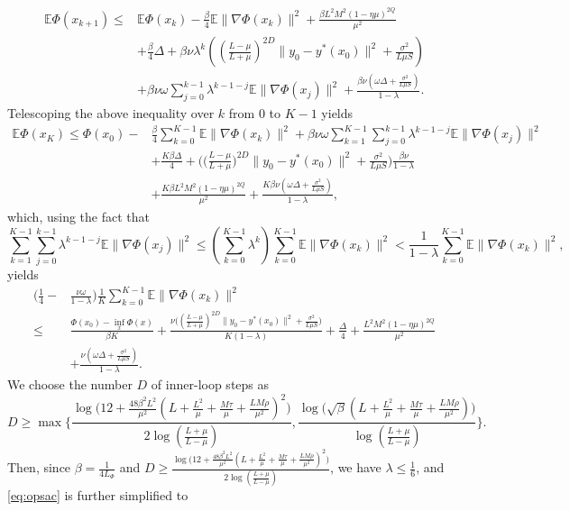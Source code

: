 \documentclass{osudissert96}
\begin{document}
\begin{align}
\mathbb{E}\Phi(x_{k+1})\leq& \mathbb{E}\Phi(x_k) -\frac{\beta}{4} \mathbb{E}\|\nabla\Phi(x_k)\|^2 +\frac{\beta L^2M^2(1-\eta \mu)^{2Q}}{\mu^2} 
\nonumber
\\&+\frac{\beta}{4} \Delta + \beta\nu\lambda^{k} \left( \left(\frac{L-\mu}{L+\mu}\right)^{2D}\|y_0-y^*(x_0)\|^2 + \frac{\sigma^2}{L\mu S}\right) \nonumber
\\&+ \beta\nu\omega\sum_{j=0}^{k-1}\lambda^{k-1-j} \mathbb{E}\|\nabla \Phi(x_j)\|^2 + \frac{\beta\nu(\omega\Delta +\frac{\sigma^2}{L\mu S})}{1-\lambda}.\nonumber
\end{align}
Telescoping the above inequality over $k$ from $0$ to $K-1$ yields
\begin{align*}
\mathbb{E}\Phi(x_{K}) \leq \Phi(x_0) - &\frac{\beta}{4} \sum_{k=0}^{K-1}\mathbb{E}\|\nabla\Phi(x_k)\|^2 + \beta\nu\omega\sum_{k=1}^{K-1}\sum_{j=0}^{k-1}\lambda^{k-1-j} \mathbb{E}\|\nabla \Phi(x_j)\|^2 \nonumber
\\&+\frac{K\beta\Delta}{4} + \Big(\Big(\frac{L-\mu}{L+\mu}\Big)^{2D}\|y_0-y^*(x_0)\|^2 + \frac{\sigma^2}{L\mu S}\Big)\frac{\beta\nu}{1-\lambda} \nonumber
\\&+ \frac{K\beta L^2M^2(1-\eta \mu)^{2Q}}{\mu^2}  + \frac{K\beta\nu(\omega\Delta +\frac{\sigma^2}{L\mu S})}{1-\lambda},
\end{align*}
which, using the fact that {\small$$\sum_{k=1}^{K-1}\sum_{j=0}^{k-1}\lambda^{k-1-j} \mathbb{E}\|\nabla \Phi(x_j)\|^2\leq \left(\sum_{k=0}^{K-1}\lambda^k\right)\sum_{k=0}^{{K-1}}\mathbb{E}\|\nabla\Phi(x_k)\|^2<\frac{1}{1-\lambda}\sum_{k=0}^{{K-1}}\mathbb{E}\|\nabla\Phi(x_k)\|^2,$$} \hspace{-0.15cm}yields
\begin{align}\label{eq:opsac}
 \Big(\frac{1}{4} -&\frac{\nu\omega}{1-\lambda}\Big) \frac{1}{K}\sum_{k=0}^{K-1}\mathbb{E}\|\nabla\Phi(x_k)\|^2 \nonumber
 \\\leq &\frac{\Phi(x_0)-\inf_x\Phi(x)}{\beta K}+\frac{\nu\big((\frac{L-\mu}{L+\mu})^{2D}\|y_0-y^*(x_0)\|^2 + \frac{\sigma^2}{L\mu S}\big)}{K(1-\lambda)}+\frac{\Delta}{4} +  \frac{ L^2M^2(1-\eta \mu)^{2Q}}{\mu^2}  \nonumber
 \\&+ \frac{\nu(\omega\Delta +\frac{\sigma^2}{L\mu S})}{1-\lambda}.
\end{align}
We choose the number $D$ of inner-loop steps as 
$$D\geq \max\bigg\{\frac{\log \big(12+  \frac{48\beta^2L^2}{\mu^2} ( L+\frac{L^2}{\mu} + \frac{M\tau}{\mu}+\frac{LM\rho}{\mu^2})^2\big)}{2\log (\frac{L+\mu}{L-\mu})},\frac{\log \big(\sqrt{\beta}(L+\frac{L^2}{\mu} + \frac{M\tau}{\mu}+\frac{LM\rho}{\mu^2})\big)}{\log (\frac{L+\mu}{L-\mu})}\bigg\}.$$ Then,  since $\beta=\frac{1}{4L_\Phi}$ and $D\geq \frac{\log \big(12+  \frac{48\beta^2L^2}{\mu^2} ( L+\frac{L^2}{\mu} + \frac{M\tau}{\mu}+\frac{LM\rho}{\mu^2})^2\big)}{2\log (\frac{L+\mu}{L-\mu})}$, we have $\lambda\leq \frac{1}{6}$, and  \cref{eq:opsac} is further simplified to 
\end{document}
